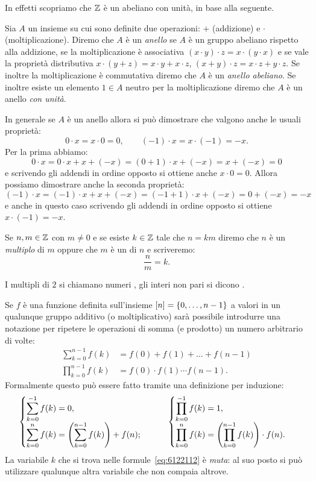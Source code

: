In effetti scopriamo che ${\mathbb Z}$ è un  abeliano con unità, in base alla seguente.
%
\begin{definition}[anello]
  Sia $A$ un insieme su cui sono definite due operazioni: $+$ (addizione) e $\cdot$ (moltiplicazione).  
  Diremo che $A$ è un \emph{anello} se $A$ è un gruppo abeliano rispetto alla 
  addizione, 
  se la moltiplicazione è associativa $(x\cdot y)\cdot z = x\cdot (y\cdot x)$ 
  e se vale la proprietà distributiva $x\cdot(y+z) = x\cdot y + x\cdot z$,
  $(x+y)\cdot z = x\cdot z + y\cdot z$.
  Se inoltre la moltiplicazione è commutativa diremo che $A$ è un \emph{anello abeliano}.
  Se inoltre esiste un elemento $1\in A$ neutro per la moltiplicazione 
  diremo che $A$ è un anello \emph{con unità}.
\end{definition}

In generale se $A$ è un anello allora si può dimostrare che valgono anche le usuali proprietà:
\[
  0\cdot x = x\cdot 0 = 0, \qquad
  (-1)\cdot x = x \cdot (-1) = -x.
\]
Per la prima abbiamo: 
\[
  0\cdot x = 0\cdot x + x + (-x) = (0+1)\cdot x + (-x) = x + (-x) = 0
\]
e scrivendo gli addendi in ordine opposto si ottiene anche $x\cdot 0 = 0$.
Allora possiamo dimostrare anche la seconda proprietà:
\[
   (-1)\cdot x = (-1)\cdot x + x + (-x) = (-1 + 1)\cdot x + (-x) = 0 + (-x) = -x
\]
e anche in questo caso scrivendo gli addendi in ordine opposto si ottiene $x\cdot(-1)=-x$.

Se $n,m\in{\mathbb Z}$ con $m\neq 0$ e 
%
se esiste $k\in{\mathbb Z}$ tale 
che $n=km$ diremo che $n$ è un \emph{multiplo}
di $m$ oppure che $m$ è un  di $n$
e scriveremo:
\[
  \frac{n}{m} = k.  
\]

I multipli di $2$ si chiamano numeri ,
gli interi non pari si dicono . 

Se $f$ è una funzione definita sull'insieme ${\left[ n \right]} = {\left\{ 0,\dots,n-1 \right\}}$ 
a valori in un qualunque gruppo additivo (o moltiplicativo) 
sarà possibile introdurre una notazione per ripetere le operazioni
di somma (e prodotto) un numero arbitrario di volte:
\begin{align}\label{eq:6122112}
  \sum_{k=0}^{n-1} f(k) &= f(0) + f(1) + \dots + f(n-1) \\
  \prod_{k=0}^{n-1} f(k) &= f(0) \cdot f(1) \cdots f(n-1).
\end{align}
Formalmente questo può essere fatto tramite una definizione per induzione:
\[
  \begin{cases}
    \displaystyle\sum_{k=0}^{-1} f(k) = 0, \\
    \displaystyle\sum_{k=0}^{n} f(k) = {\left( \sum_{k=0}^{n-1} f(k) \right)} + f(n);
  \end{cases}  \qquad
  \begin{cases}
    \displaystyle\prod_{k=0}^{-1} f(k) = 1, \\
    \displaystyle\prod_{k=0}^{n} f(k) = {\left( \prod_{k=0}^{n-1} f(k) \right)} \cdot f(n).
  \end{cases}
\]
La variabile $k$ che si trova nelle formule~\eqref{eq:6122112} è \emph{muta}: 
al suo posto si può utilizzare qualunque altra variabile che non
compaia altrove.

